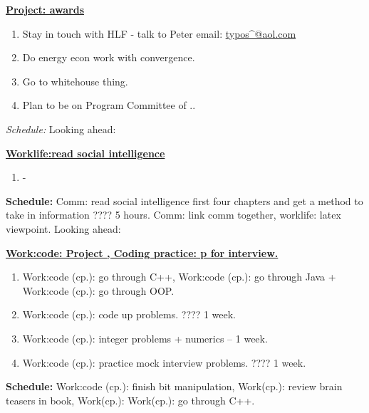 \begin{multicols}{4}
\samepage
\begin{minipage}{\columnwidth}
\underline{\bf \tiny {Project: awards}}\\
\begin{enumerate} 
\item \tiny Stay in touch with HLF - talk to Peter email:  \url{typos^@aol.com}
\item \tiny Do energy econ work with convergence. 
\item \tiny Go to whitehouse thing. 
\item \tiny Plan to be on Program Committee of .. 
\end{enumerate}
\tiny \textit{Schedule:} Looking ahead:\\ 
\end{minipage}
\samepage
\begin{minipage}{\columnwidth}
\underline{\bf \tiny {Worklife:read social intelligence}}
\begin{enumerate} 
\tiny \item \tiny -
\end{enumerate} 
{{\bf  \tiny {Schedule:}} Comm: read social intelligence first four chapters
and get a method to take in information ???? 5 hours. Comm: link comm
together, worklife: latex viewpoint. Looking ahead:} \\
\end{minipage}

\begin{minipage}{\columnwidth}
\underline{\bf Work:code: Project , Coding practice: p for interview.}
\begin{enumerate}
\tiny \item \tiny Work:code (cp.): go through C++, Work:code (cp.): go
through Java + Work:code (cp.): go through OOP. 
\item \tiny Work:code (cp.): code up problems.  ???? 1 week.
\item \tiny Work:code (cp.): integer problems + numerics   -- 1 week.
\item \tiny Work:code (cp.): practice mock interview problems. ???? 1  week.
\end{enumerate}
{{\bf \tiny {Schedule:}} Work:code (cp.): finish bit
  manipulation, Work(cp.): review brain teasers in book, Work(cp.):
  Work(cp.): go through C++.}\\
\end{minipage}
\end{multicols}


